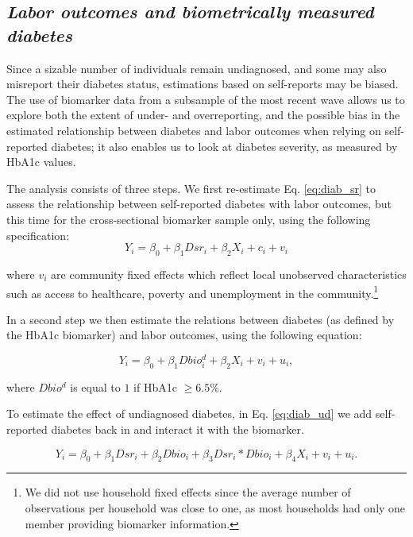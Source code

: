 \documentclass[12pt,english]{article}
\begin{document}
\subsection{\label{sec:Biomarker Strategy}\textit{Labor outcomes and biometrically measured diabetes}}

Since a sizable number of individuals remain undiagnosed, and some may also misreport their diabetes status, estimations based on self-reports may be biased. The use of biomarker data from a subsample of the most recent wave allows us to explore both the extent of under- and overreporting, and the possible bias in the estimated relationship between diabetes and labor outcomes when relying on self-reported diabetes; it also enables us to look at diabetes severity, as measured by \ac{HbA1c} values. 

The analysis consists of three steps. We first re-estimate Eq. \ref{eq:diab_sr} to assess the relationship between self-reported diabetes with labor outcomes, but this time for the cross-sectional biomarker sample only, using the following specification:
\begin{equation}
Y_{i}=\beta_{0}+\beta_{1}Dsr_{i}+\beta_{2}X_{i}+c_{i}+v_{i}\label{eq:diab_sr}
\end{equation}

where $v_{i}$ are community fixed effects which reflect local unobserved characteristics such as access to healthcare, poverty and unemployment in the community.\footnote{We did not use household fixed effects since the average number of observations per household was close to one, as most households had only one member providing biomarker information.}

In a second step we then estimate the relations between diabetes (as defined by the \ac{HbA1c} biomarker) and labor outcomes, using the following equation:

\begin{equation}
Y_{i}=\beta_{0}+\beta_{1}Dbio^{d}_{i}+\beta_{2}X_{i}+v_{i}+u_{i}\label{eq:diab},
\end{equation}

where $Dbio^{d}$ is equal to $1$ if \ac{HbA1c} $\geq6.5\%$. 

To estimate the effect of undiagnosed diabetes, in Eq. \ref{eq:diab_ud} we add self-reported diabetes back in and interact it with the biomarker.

\begin{equation}
Y_{i}=\beta_{0}+\beta_{1}Dsr_{i}+\beta_{2}Dbio_{i}+\beta_{3}Dsr_{i}*Dbio_{i}+\beta_{4}X_{i}+v_{i}+u_{i}.\label{eq:diab_ud}
\end{equation}
\end{document}
